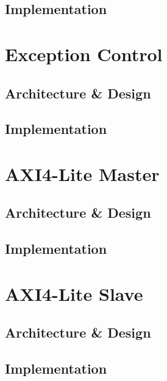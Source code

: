 \subsection{Implementation}

\section{Exception Control}
\subsection{Architecture \& Design}
\subsection{Implementation}

\section{AXI4-Lite Master}
\subsection{Architecture \& Design}
\subsection{Implementation}

\section{AXI4-Lite Slave}
\subsection{Architecture \& Design}
\subsection{Implementation}
